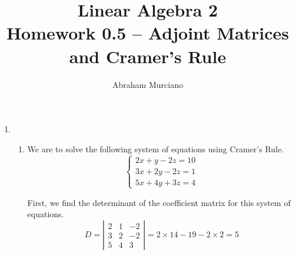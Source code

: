 \documentclass[fleqn]{article}
\title{Linear Algebra 2 \\
\medskip
\large Homework 0.5 -- Adjoint Matrices and Cramer's Rule}
\author{Abraham Murciano}
\newenvironment{answers}{ %
	\begin{enumerate}
		\setlength{\itemsep}{\bigskipamount}
}{\end{enumerate}}
\begin{document}
\maketitle

\begin{answers}

	\item
		\begin{enumerate}
			\item
				We are to solve the following system of equations using Cramer's Rule.
				\begin{equation*}
					\begin{cases}
						2x+y-2z = 10 \\
						3x+2y-2z = 1 \\
						5x+4y+3z = 4
					\end{cases}
				\end{equation*}

				First, we find the determinant of the coefficient matrix for this system of equations.
				\begin{equation*}
					D =
					\left|
					\begin{matrix}
						2 & 1 & -2 \\
						3 & 2 & -2 \\
						5 & 4 & 3
					\end{matrix}
					\right|
					= 2 \times 14 - 19 - 2 \times 2 = 5
				\end{equation*}


\end{enumerate}
\end{answers}
\end{document}
